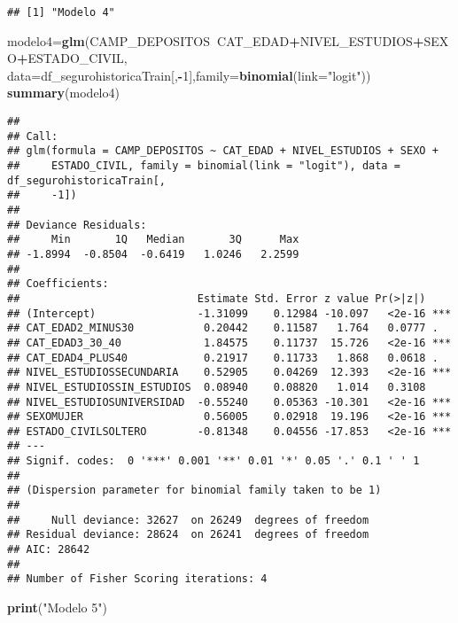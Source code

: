 \documentclass[]{article}
\newenvironment{Shaded}{\begin{snugshade}}{\end{snugshade}}
\newcommand{\KeywordTok}[1]{\textcolor[rgb]{0.13,0.29,0.53}{\textbf{#1}}}
\newcommand{\DataTypeTok}[1]{\textcolor[rgb]{0.13,0.29,0.53}{#1}}
\newcommand{\DecValTok}[1]{\textcolor[rgb]{0.00,0.00,0.81}{#1}}
\newcommand{\StringTok}[1]{\textcolor[rgb]{0.31,0.60,0.02}{#1}}
\newcommand{\OperatorTok}[1]{\textcolor[rgb]{0.81,0.36,0.00}{\textbf{#1}}}
\newcommand{\NormalTok}[1]{#1}
\begin{document}
\begin{verbatim}
## [1] "Modelo 4"
\end{verbatim}

\begin{Shaded}
\begin{Highlighting}[]
\NormalTok{modelo4=}\KeywordTok{glm}\NormalTok{(CAMP_DEPOSITOS}\OperatorTok{~}\NormalTok{CAT_EDAD}\OperatorTok{+}\NormalTok{NIVEL_ESTUDIOS}\OperatorTok{+}\NormalTok{SEXO}\OperatorTok{+}\NormalTok{ESTADO_CIVIL, }\DataTypeTok{data=}\NormalTok{df_segurohistoricaTrain[,}\OperatorTok{-}\DecValTok{1}\NormalTok{],}\DataTypeTok{family=}\KeywordTok{binomial}\NormalTok{(}\DataTypeTok{link=}\StringTok{"logit"}\NormalTok{))}
\KeywordTok{summary}\NormalTok{(modelo4)}
\end{Highlighting}
\end{Shaded}

\begin{verbatim}
## 
## Call:
## glm(formula = CAMP_DEPOSITOS ~ CAT_EDAD + NIVEL_ESTUDIOS + SEXO + 
##     ESTADO_CIVIL, family = binomial(link = "logit"), data = df_segurohistoricaTrain[, 
##     -1])
## 
## Deviance Residuals: 
##     Min       1Q   Median       3Q      Max  
## -1.8994  -0.8504  -0.6419   1.0246   2.2599  
## 
## Coefficients:
##                            Estimate Std. Error z value Pr(>|z|)    
## (Intercept)                -1.31099    0.12984 -10.097   <2e-16 ***
## CAT_EDAD2_MINUS30           0.20442    0.11587   1.764   0.0777 .  
## CAT_EDAD3_30_40             1.84575    0.11737  15.726   <2e-16 ***
## CAT_EDAD4_PLUS40            0.21917    0.11733   1.868   0.0618 .  
## NIVEL_ESTUDIOSSECUNDARIA    0.52905    0.04269  12.393   <2e-16 ***
## NIVEL_ESTUDIOSSIN_ESTUDIOS  0.08940    0.08820   1.014   0.3108    
## NIVEL_ESTUDIOSUNIVERSIDAD  -0.55240    0.05363 -10.301   <2e-16 ***
## SEXOMUJER                   0.56005    0.02918  19.196   <2e-16 ***
## ESTADO_CIVILSOLTERO        -0.81348    0.04556 -17.853   <2e-16 ***
## ---
## Signif. codes:  0 '***' 0.001 '**' 0.01 '*' 0.05 '.' 0.1 ' ' 1
## 
## (Dispersion parameter for binomial family taken to be 1)
## 
##     Null deviance: 32627  on 26249  degrees of freedom
## Residual deviance: 28624  on 26241  degrees of freedom
## AIC: 28642
## 
## Number of Fisher Scoring iterations: 4
\end{verbatim}

\begin{Shaded}
\begin{Highlighting}[]
\KeywordTok{print}\NormalTok{(}\StringTok{"Modelo 5"}\NormalTok{)}
\end{Highlighting}
\end{Shaded}
\end{document}
